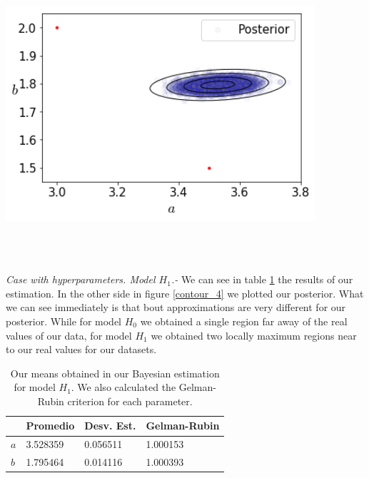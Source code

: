 \documentclass[onecolumn,           %
               showpacs,            %
               preprintnumbers,     %
               aps,                 %
               prl,          	    %
               letterpaper,             %
               superscriptaddress,      %
               nofootinbib,         %
               tightenlines,        %
               floats,floatfix      %
               ,usenatbib,
               ]{revtex4-1}
\begin{document}
\begin{minipage}{\textwidth}
\centering
\includegraphics[height=8cm]{Figures/contour_3.png}
\label{contour_3}
\end{minipage}\\ $ $

\textit{Case with hyperparameters. Model $H_1$.-} We can see in table \ref{tab3} the results of our estimation. In the other side in figure \ref{contour_4} we plotted our posterior. What we can see immediately is that bout approximations are very different for our posterior. While for model $H_0$ we obtained a single region far away of the real values of our data, for model $H_1$ we obtained two locally maximum regions near to our real values for our datasets.  

\begin{table}[h!]
\centering
\begin{tabular}{||l|l|l|l||} 
 \hline
 & \textbf{Promedio} & \textbf{Desv. Est.} & \textbf{Gelman-Rubin} \\ [0.5ex] 
 \hline\hline
$a$ & 3.528359 	 & 0.056511 & 1.000153 \\
\hline
$b$ & 1.795464 & 0.014116 	 	 & 1.000393\\ [1ex] 
 \hline
\end{tabular}
\caption{\footnotesize{Our means obtained in our Bayesian estimation for model $H_1$. We also calculated the Gelman-Rubin criterion for each parameter.}}
\label{tab3}
\end{table}
\end{document}
